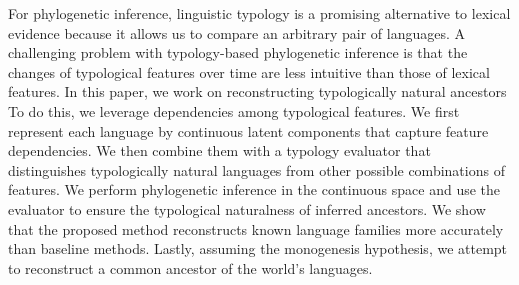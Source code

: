 For phylogenetic inference, linguistic typology is a promising alternative to lexical evidence  because it allows us to compare an arbitrary pair of languages. A challenging problem with typology-based phylogenetic inference is that the changes of typological features over time are less intuitive than those of lexical features. In this paper, we work on reconstructing typologically natural ancestors To do this, we leverage dependencies among typological features. We first represent each language by continuous latent components that capture feature dependencies. We then combine them with a typology evaluator that distinguishes typologically natural languages from other possible combinations of features. We perform phylogenetic inference in the continuous space and use the evaluator to ensure the typological naturalness of inferred ancestors. We show that the proposed method reconstructs known language families more accurately than baseline methods. Lastly, assuming the monogenesis hypothesis, we attempt to reconstruct a common ancestor of the world's languages.
